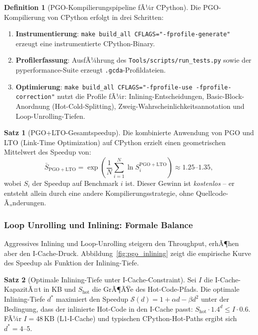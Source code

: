 ﻿\documentclass[a4paper,12pt]{scrreprt}
\theoremstyle{definition}
\newtheorem{definition}{Definition}[section]
\newtheorem{satz}{Satz}[section]
\begin{document}
	\begin{definition}[PGO-Kompilierungspipeline fÃ¼r CPython]
		\label{def:pgo}
		Die PGO-Kompilierung von CPython erfolgt in drei Schritten:
		\begin{enumerate}[noitemsep]
			\item \textbf{Instrumentierung}: \texttt{make build\_all CFLAGS="-fprofile-generate"}
			erzeugt eine instrumentierte CPython-Binary.
			\item \textbf{Profilerfassung}: AusfÃ¼hrung des
			\texttt{Tools/scripts/run\_tests.py} sowie der pyperformance-Suite
			erzeugt \texttt{.gcda}-Profildateien.
			\item \textbf{Optimierung}: \texttt{make build\_all CFLAGS="-fprofile-use -fprofile\newline -correction"}
			nutzt die Profile fÃ¼r: Inlining-Entscheidungen, Basic-Block-Anord\-nung
			(Hot-Cold-Splitting), Zweig-Wahrscheinlichkeitsannotation und
			Loop-Unrolling-Tiefen.
		\end{enumerate}
	\end{definition}
	
	\begin{satz}[PGO+LTO-Gesamtspeedup]
		\label{satz:pgo_total}
		Die kombinierte Anwendung von PGO und LTO (Link-Time Optimization)
		auf CPython erzielt einen geometrischen Mittelwert des Speedup von:
		\[
		\bar{S}_{\mathrm{PGO+LTO}} = \exp\!\left(\frac{1}{N}
		\sum_{i=1}^N \ln S_i^{\mathrm{PGO+LTO}}\right) \approx 1.25\text{--}1.35,
		\]
		wobei $S_i$ der Speedup auf Benchmark $i$ ist. Dieser Gewinn ist
		\emph{kostenlos} -- er entsteht allein durch eine andere
		Kompilierungsstrategie, ohne Quellcode-Ã„nderungen.
	\end{satz}
	
	\subsubsection{Loop Unrolling und Inlining: Formale Balance}
	
	Aggressives Inlining und Loop-Unrolling steigern den Throughput,
	erhÃ¶hen aber den I-Cache-Druck. Abbildung~\ref{fig:pgo_inlining}
	zeigt die empirische Kurve des Speedup als Funktion der Inlining-Tiefe.
	
	\begin{satz}[Optimale Inlining-Tiefe unter I-Cache-Constraint]
		\label{satz:inlining_depth}
		Sei $I$ die I-Cache-KapazitÃ¤t in KB und $S_{\mathrm{hot}}$ die GrÃ¶ÃŸe
		des Hot-Code-Pfads. Die optimale Inlining-Tiefe $d^*$ maximiert den
		Speedup $\mathcal{S}(d) = 1 + \alpha d - \beta d^2$ unter der Bedingung,
		dass der inlinierte Hot-Code in den I-Cache passt:
		$S_{\mathrm{hot}} \cdot 1.4^d \le I \cdot 0.6$. FÃ¼r
		$I = 48\,\mathrm{KB}$ (L1-I-Cache) und typischen CPython-Hot-Paths
		ergibt sich $d^* = 4$--$5$.
	\end{satz}
	
\end{document}
